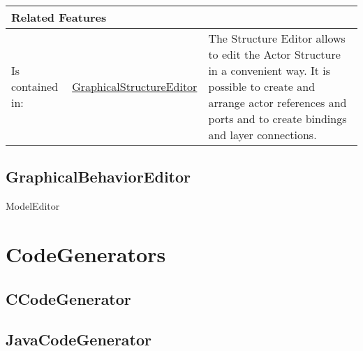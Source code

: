 			
			
			\begingroup
			\renewcommand{\arraystretch}{1.8} %
			\begin{longtable}{p{2.5cm}|p{4cm} p{}}
				\multicolumn{2}{l}{\textbf{\large Related Features}} & \\
				\hline
			Is contained in: & \tabitem \hyperlink{ref:GraphicalStructureEditor}{GraphicalStructureEditor}  & The Structure Editor allows to edit the Actor Structure in a convenient way. It is possible to create and arrange actor references and ports and to create bindings and layer connections.\\
			\hline
			\end{longtable}
			\endgroup
			
			
			
		\vspace{\baselineskip}
		\vspace{\baselineskip}
		\vspace{\baselineskip}
		\subsection{\huge GraphicalBehaviorEditor}
		ModelEditor
	
		
\section{\huge CodeGenerators}
	
		\subsection{\huge CCodeGenerator}
	
		
		\subsection{\huge JavaCodeGenerator}
	
		


